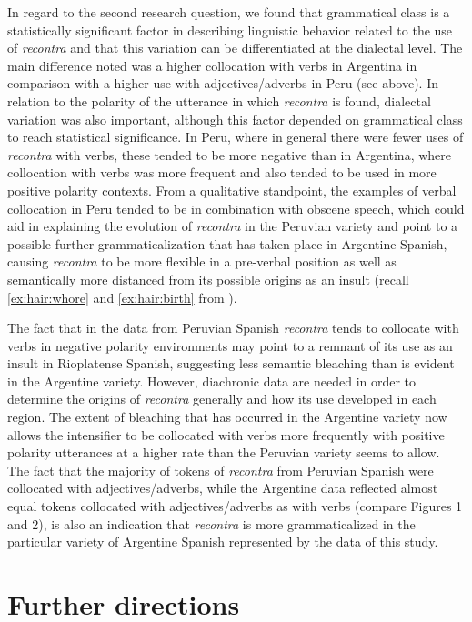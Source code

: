 \documentclass[output=paper,colorlinks,citecolor=brown,
]{langscibook}
\begin{document}
In regard to the second research question, we found that grammatical class is a statistically significant factor in describing linguistic behavior related to the use of \textit{recontra} and that this variation can be differentiated at the dialectal level. The main difference noted was a higher collocation with verbs in Argentina in comparison with a higher use with adjectives/adverbs in Peru (see  above). In relation to the polarity of the utterance in which \textit{recontra} is found, dialectal variation was also important, although this factor depended on grammatical class to reach statistical significance. In Peru, where in general there were fewer uses of \textit{recontra} with verbs, these tended to be more negative than in Argentina, where collocation with verbs was more frequent and also tended to be used in more positive polarity contexts. From a qualitative standpoint, the examples of verbal collocation in Peru tended to be in combination with obscene speech, which could aid in explaining the evolution of \textit{recontra} in the Peruvian variety and point to a possible further grammaticalization that has taken place in Argentine Spanish, causing \textit{recontra} to be more flexible in a pre-verbal position as well as semantically more distanced from its possible origins as an insult (recall \ref{ex:hair:whore} and \ref{ex:hair:birth} from ). 

The fact that in the data from Peruvian Spanish \textit{recontra} tends to collocate with verbs in negative polarity environments may point to a remnant of its use as an insult in Rioplatense Spanish, suggesting less semantic bleaching than is evident in the Argentine variety. However, diachronic data are needed in order to determine the origins of \textit{recontra} generally and how its use developed in each region. The extent of bleaching that has occurred in the Argentine variety now allows the intensifier to be collocated with verbs more frequently with positive polarity utterances at a higher rate than the Peruvian variety seems to allow. The fact that the majority of tokens of \textit{recontra} from Peruvian Spanish were collocated with adjectives/adverbs, while the Argentine data reflected almost equal tokens collocated with adjectives/adverbs as with verbs (compare Figures 1 and 2), is also an indication that \textit{recontra} is more grammaticalized in the particular variety of Argentine Spanish represented by the data of this study. 

\section{Further directions}
\end{document}
